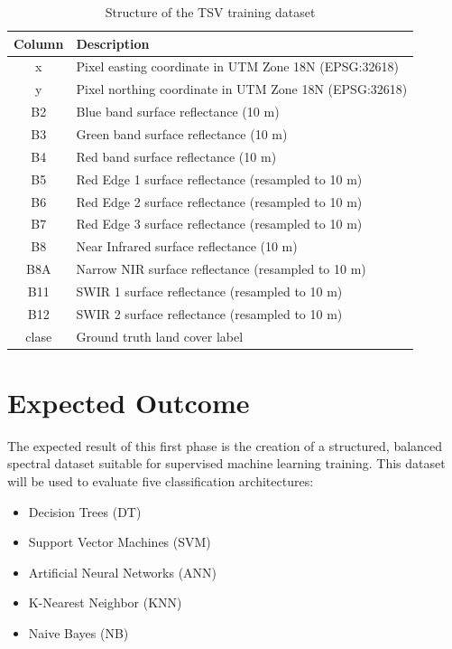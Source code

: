 \documentclass[12pt,a4paper]{article}
\begin{document}
\begin{table}[H]
\centering
\begin{tabular}{|c|m{9cm}|}
\hline
\textbf{Column} & \textbf{Description} \\
\hline
x & Pixel easting coordinate in UTM Zone 18N (EPSG:32618) \\
\hline
y & Pixel northing coordinate in UTM Zone 18N (EPSG:32618) \\
\hline
B2 & Blue band surface reflectance (10 m) \\
\hline
B3 & Green band surface reflectance (10 m) \\
\hline
B4 & Red band surface reflectance (10 m) \\
\hline
B5 & Red Edge 1 surface reflectance (resampled to 10 m) \\
\hline
B6 & Red Edge 2 surface reflectance (resampled to 10 m) \\
\hline
B7 & Red Edge 3 surface reflectance (resampled to 10 m) \\
\hline
B8 & Near Infrared surface reflectance (10 m) \\
\hline
B8A & Narrow NIR surface reflectance (resampled to 10 m) \\
\hline
B11 & SWIR 1 surface reflectance (resampled to 10 m) \\
\hline
B12 & SWIR 2 surface reflectance (resampled to 10 m) \\
\hline
clase & Ground truth land cover label \\
\hline
\end{tabular}
\caption{Structure of the TSV training dataset}
\end{table}

\section{Expected Outcome}

The expected result of this first phase is the creation of a structured, balanced spectral dataset suitable for supervised machine learning training. This dataset will be used to evaluate five classification architectures:

\begin{itemize}
    \item Decision Trees (DT)
    \item Support Vector Machines (SVM)
    \item Artificial Neural Networks (ANN)
    \item K-Nearest Neighbor (KNN)
    \item Naive Bayes (NB)
\end{itemize}
\end{document}
